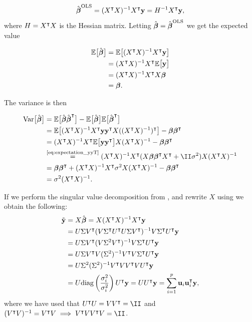 \begin{align}\label{eq:optimal_beta_ols}
    \hat{\boldsymbol{\beta}}^\text{OLS} = (X^\intercal X)^{-1} X^\intercal \mathbf{y} = H^{-1} X^\intercal \mathbf{y},
\end{align}
where $H = X^\intercal X$ is the Hessian matrix.
Letting $\hat{\boldsymbol{\beta}} = \hat{\boldsymbol{\beta}}^\text{OLS}$ we get the expected value 

\begin{align*}
    \mathbb{E}\big[\hat{\boldsymbol{\beta}}\big] &= \mathbb{E}\big[(X^\intercal X)^{-1} X^\intercal \mathbf{y}\big] \\
    &= (X^\intercal X)^{-1} X^\intercal \mathbb{E}\big[\mathbf{y}\big] \\
    &= (X^\intercal X)^{-1} X^\intercal X \boldsymbol{\beta} \\
    &= \boldsymbol{\beta}.
\end{align*}

The variance is then 

\begin{align}\label{eq:variance_of_optimal_beta_ols}
    \variance{\optbeta} &= \EE{\optbeta \optbeta\TT} -\EE{\optbeta} \EE{\optbeta\TT} \nonumber \\
    &= \EE{\invhessian X\TT  \vec{y} \vec{y}\TT X (\invhessian)\TT} - \svec{\beta} \svec{\beta}\TT \nonumber \\
    &= \invhessian X\TT \EE{ \vec{y} \vec{y}\TT } X \invhessian - \svec{\beta} \svec{\beta}\TT \nonumber \\
    &\stackrel{\text{\eqref{eq:expectation_yyT}}}{=}\invhessian X\TT ( X\svec{\beta} \svec{\beta}\TT X\TT+ \II\sigma^2) X \invhessian \nonumber \\
    &= \svec{\beta} \svec{\beta} \TT + \invhessian X\TT \sigma^2 X \invhessian - \svec{\beta} \svec{\beta} \TT \nonumber \\
    &= \sigma^2 \invhessian.
\end{align}

If we perform the singular value decomposition from , and rewrite $X$ using  we obtain the following:
\begin{align}\label{eq:ols_svd}
    \tilde{\mathbf{y}} &= X\hat{\boldsymbol{\beta}} = X(X^\intercal X)^{-1} X^\intercal \mathbf{y} \nonumber\\
    &= U\Sigma V^\intercal(V\Sigma^\intercal U^\intercal U\Sigma V^\intercal)^{-1}V\Sigma^\intercal U^\intercal\mathbf{y} \nonumber\\
    &= U\Sigma V^\intercal(V\Sigma^2V^\intercal)^{-1}V\Sigma^\intercal U^\intercal\mathbf{y}\nonumber \\
    &= U\Sigma V^\intercal V(\Sigma^2)^{-1}V^\intercal V\Sigma^\intercal U^\intercal\mathbf{y}\nonumber \\
    &= U\Sigma^2(\Sigma^2)^{-1}V^\intercal V V^\intercal VU^\intercal\mathbf{y} \nonumber\\
    &= U\text{diag}\left(\frac{\sigma_i^2}{\sigma_i^2}\right)U^\intercal\mathbf{y} = UU^\intercal\mathbf{y} = \sum_{i=1}^p\mathbf{u}_i\mathbf{u}^\intercal_i\mathbf{y},
\end{align}
where we have used that $\UT U = V\VT = \II$ and $(\VT V)^{-1} = \VT V \implies \VT V \VT V = \II$. 


